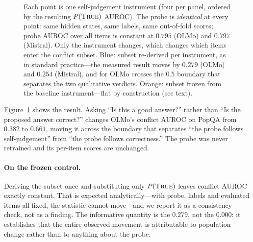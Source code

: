 \documentclass[10pt]{article}
\newcommand{\ptrue}{P(\textsc{True})}
\begin{document}
\begin{figure}[t]
\vspace{1pt}
\centering
{}
\caption{Each point is one self-judgement instrument (four per panel, ordered by the resulting
$\ptrue{}$ AUROC). The probe is \emph{identical} at every point: same hidden states, same labels,
same out-of-fold scores; probe AUROC over all items is constant at $0.795$ (OLMo) and $0.797$
(Mistral). Only the instrument changes, which changes which items enter the conflict subset.
Blue: subset re-derived per instrument, as in standard practice---the measured result moves by
$0.279$ (OLMo) and $0.254$ (Mistral), and for OLMo crosses the $0.5$ boundary that separates the
two qualitative verdicts. Orange: subset frozen from the baseline instrument---flat by construction
(see text).}
\label{fig:conflict}
\end{figure}

Figure~\ref{fig:conflict} shows the result. Asking ``Is this a good answer?'' rather than ``Is the
proposed answer correct?'' changes OLMo's conflict AUROC on PopQA from $0.382$ to $0.661$, moving it
across the boundary that separates ``the probe follows self-judgement'' from ``the probe follows
correctness.'' The probe was never retrained and its per-item scores are unchanged.

\paragraph{On the frozen control.} Deriving the subset once and substituting only $\ptrue{}$ leaves
conflict AUROC exactly constant. That is expected analytically---with probe, labels and evaluated
items all fixed, the statistic cannot move---and we report it as a consistency check, not as a
finding. The informative quantity is the $0.279$, not the $0.000$: it establishes that the entire
observed movement is attributable to population change rather than to anything about the probe.
\end{document}
